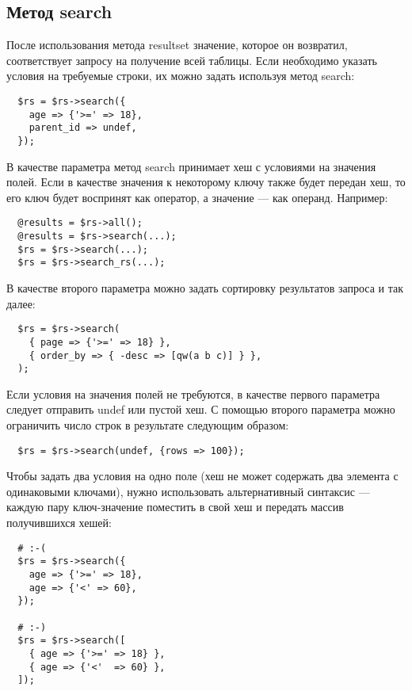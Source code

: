 \subsection{Метод search}
После использования метода resultset значение, которое он возвратил, соответствует запросу на получение всей таблицы. Если необходимо указать условия на требуемые строки, их можно задать используя метод search:
\begin{verbatim}
  $rs = $rs->search({
    age => {'>=' => 18},
    parent_id => undef,
  });
\end{verbatim}
В качестве параметра метод search принимает хеш с условиями на значения полей. Если в качестве значения к некоторому ключу также будет передан хеш, то его ключ будет воспринят как оператор, а значение --- как операнд. Например:
\begin{verbatim}
  @results = $rs->all();
  @results = $rs->search(...);
  $rs = $rs->search(...);
  $rs = $rs->search_rs(...);
\end{verbatim}
В качестве второго параметра можно задать сортировку результатов запроса и так далее:
\begin{verbatim}
  $rs = $rs->search(
    { page => {'>=' => 18} },
    { order_by => { -desc => [qw(a b c)] } },
  );
\end{verbatim}
Если условия на значения полей не требуются, в качестве первого параметра следует отправить undef или пустой хеш. С помощью второго параметра можно ограничить число строк в результате следующим образом:
\begin{verbatim}
  $rs = $rs->search(undef, {rows => 100});
\end{verbatim}
Чтобы задать два условия на одно поле (хеш не может содержать два элемента с одинаковыми ключами), нужно использовать альтернативный синтаксис --- каждую пару ключ-значение поместить в свой хеш и передать массив получившихся хешей:
\begin{verbatim}
  # :-(
  $rs = $rs->search({
    age => {'>=' => 18},
    age => {'<' => 60},
  });

  # :-)
  $rs = $rs->search([
    { age => {'>=' => 18} },
    { age => {'<'  => 60} },
  ]);
\end{verbatim}

